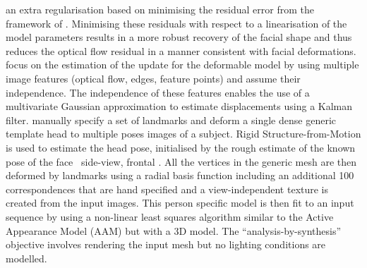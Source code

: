 an extra regularisation based on minimising the residual error from the
framework of \citet{decarlo2000optical}. Minimising these residuals with respect
to a linearisation of the model parameters results in a more robust recovery of
the facial shape and thus reduces the optical flow residual in a manner
consistent with facial deformations.
\citet{goldenstein2004facial} focus on the estimation of the update for
the deformable model by using multiple image features (optical flow,
edges, feature points) and assume their independence. The independence
of these features enables the use of a multivariate Gaussian approximation
to estimate displacements using a Kalman filter.
\citet{pighin2002modeling} manually specify a set of landmarks and deform
a single dense generic template head to multiple poses images of a subject. 
Rigid Structure-from-Motion is used to estimate the head pose, initialised
by the rough estimate of the known pose of the face \eg~side-view, frontal \etc.
All the vertices in the generic mesh are then deformed by landmarks
using a radial basis function including an additional 100 correspondences
that are hand specified and a view-independent texture is created from the input
images. This person specific model is then fit to an input
sequence by using a non-linear least squares algorithm similar to the Active
Appearance Model (AAM) but with a 3D model. The ``analysis-by-synthesis''
objective involves rendering the input mesh but no lighting conditions are
modelled.

